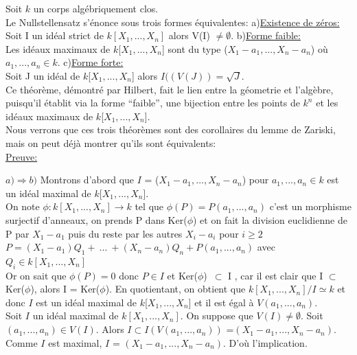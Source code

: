 \documentclass[10pt, twoside]{article}
\theoremstyle{plain}
\theoremstyle{definition}
\theoremstyle{plain}
\theoremstyle{plain}
\theoremstyle{definition}
\theoremstyle{remark}
\begin{document}
Soit $k$ un corps algébriquement clos.
\\ Le Nullstellensatz s'énonce sous trois formes équivalentes:
\flushleft a)\underline{Existence de zéros:}
\\Soit I un idéal strict de  $k[X_{1},...,X_{n}] $  alors V(I) $\neq \emptyset$.
\flushleft b)\underline{Forme faible:}
\\ Les idéaux maximaux de $k$[$X_{1},...,X_{n}$] sont du type ($X_{1} - a_{1}, ... ,  X_{n} - a_{n}$) où $a_{1},..., a_{n} \in  k $.
\flushleft c)\underline{Forme forte:} \\
Soit J un idéal de $k$[$X_{1},...,X_{n}$] alors $I((V(J)) = \sqrt{J}$.
\vspace{1\baselineskip}
\\ 
Ce théorème, démontré par Hilbert, fait le lien entre la géometrie et l'algèbre, puisqu'il
établit via la forme “faible”, une bijection entre les points de $k^n$ et les idéaux maximaux de $k$[$X_{1},...,X_{n}$].
\\ Nous verrons que ces trois théorèmes sont des corollaires du lemme de Zariski, mais on peut déjà montrer qu'ils sont équivalents:
\vspace{1\baselineskip}
\\ \underline{Preuve:} 

\item[•] $ a) \Rightarrow b) $ 
Montrons d'abord que  $I$ = ($X_{1} - a_{1}, ... ,  X_{n} - a_{n}$) pour $a_{1},..., a_{n} \in  k $ est un idéal maximal de $ k$[$X_{1},...,X_{n}$].
\\ On note 
$ \phi : k[X_{1},...,X_{n}] \longrightarrow k $ tel que $\phi(P) =P(a_{1},..., a_{n}) $
c'est un morphisme surjectif d'anneaux, on prends P dans Ker($\phi$) et on fait la division euclidienne de P par $ X_{1} - a_{1} $ puis du reste par les autres $X_{i} - a_{i}$ pour $ i \geq 2 $ 
\\

\centering 
$P = (X_{1} - a_{1})Q_{1} + \ ... \ + (X_{n} - a_{n})Q_{n} + P(a_{1},..., a_{n} ) $ avec $Q_{i} \in k[X_{1},...,X_{n}] $
\\
\flushleft Or on sait que $\phi( P) = 0$ donc $ P \in I  $ et Ker($\phi$)\ $\subset$ I , car il est clair que I $\subset$ Ker($\phi$), alors I = Ker($\phi$). En quotientant, on obtient que  $k[X_{1},...,X_{n}]/I \simeq k $ et donc $I$ est un idéal maximal de $ k$[$X_{1},...,X_{n}$] et il est égal à $V({a_{1},..., a_{n}})$.
\\
Soit $I$ un idéal maximal de $ k[X_{1},...,X_{n}]$. On suppose que  $ V(I) \neq \emptyset$. Soit  $(a_{1},..., a_{n}) \in V(I) $. Alors $I\subset I(V({a_{1},..., a_{n}}))  $ =$(X_{1} - a_{1}, ... ,  X_{n} - a_{n})$. 
Comme $I$ est maximal, $I$ = $(X_{1} - a_{1}, ... ,  X_{n} - a_{n})$. D'où l'implication.
\end{document}
